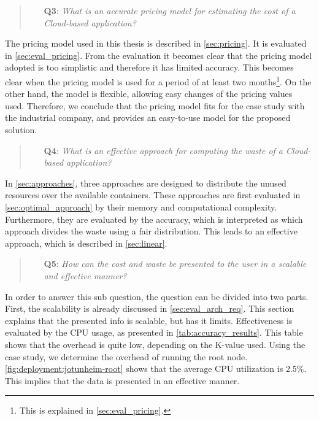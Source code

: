 \begin{quote}
    \begin{itemize}
        \item[\textbf{Q3}: ]\textit{What is an accurate pricing model for estimating the cost of a Cloud-based application?}
    \end{itemize}
\end{quote}
\noindent
The pricing model used in this thesis is described in \autoref{sec:pricing}. It is evaluated in \autoref{sec:eval_pricing}. From the evaluation it becomes clear that the pricing model adopted is too simplistic and therefore it has limited accuracy. This becomes clear when the pricing model is used for a period of at least two months\footnote{This is explained in \autoref{sec:eval_pricing}.}. On the other hand, the model is flexible, allowing easy changes of the pricing values used. Therefore, we conclude that the pricing model fits for the case study with the industrial company, and provides an easy-to-use model for the proposed solution.


\begin{quote}
    \begin{itemize}
        \item[\textbf{Q4}: ]\textit{What is an effective approach for computing the waste of a Cloud-based application?}
    \end{itemize}
\end{quote}
\noindent
In \autoref{sec:approaches}, three approaches are designed to distribute the unused resources over the available containers. These approaches are first evaluated in \autoref{sec:optimal_approach} by their memory and computational complexity. Furthermore, they are evaluated by the accuracy, which is interpreted as which approach divides the waste using a fair distribution. This leads to an effective approach, which is described in \autoref{sec:linear}.

\begin{quote}
    \begin{itemize}
        \item[\textbf{Q5}: ]\textit{How can the cost and waste be presented to the user in a scalable and effective manner?}
    \end{itemize}
\end{quote}
\noindent
In order to answer this sub question, the question can be divided into two parts. First, the scalability is already discussed in \autoref{sec:eval_arch_req}. This section explains that the presented info is scalable, but has it limits. Effectiveness is evaluated by the CPU usage, as presented in \autoref{tab:accuracy_results}. This table shows that the overhead is quite low, depending on the K-value used. Using the case study, we determine the overhead of running the root node. \autoref{fig:deployment:jotunheim-root} shows that the average CPU utilization is $2.5\%$. This implies that the data is presented in an effective manner. 

